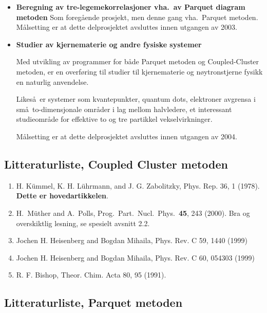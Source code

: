 \begin{itemize}
\item {\bf Beregning av tre-legemekorrelasjoner vha.\ av 
            Parquet diagram  metoden}
Som foreg\aa ende prosjekt, men denne gang vha.~Parquet metoden.
M\aa lsetting er at dette delprosjektet avsluttes innen utgangen av 2003.


\item {\bf Studier av kjernematerie og andre fysiske systemer}

Med utvikling av programmer for b\aa de Parquet metoden og Coupled-Cluster
metoden, er en overf\o ring til studier til kjernematerie og n\o ytronstjerne
fysikk en naturlig anvendelse. 

Likes\aa\ er systemer som kvantepunkter, quantum dots, elektroner avgrensa
i sm\aa\ to-dimensjonale omr\aa der i lag mellom halvledere,
et interessant studieomr\aa de for effektive to og tre partikkel 
vekselvirkninger.

M\aa lsetting er at dette delprosjektet avsluttes innen utgangen av 2004.

\end{itemize}



\subsection*{Litteraturliste, Coupled Cluster metoden}

\begin{enumerate}
\item H. K\"ummel, K. H. L\"uhrmann, and J. G. Zabolitzky, Phys. Rep.
36, 1 (1978). {\bf Dette er hovedartikkelen}.
\item H.~M\"uther and A.~Polls, Prog.~Part.~Nucl.~Phys.~{\bf 45}, 243 (2000).
Bra og overskiktlig lesning, se spesielt avsnitt 2.2.
\item Jochen H. Heisenberg and Bogdan Mihaila, 
Phys. Rev. C 59, 1440 (1999)
\item Jochen H. Heisenberg and Bogdan Mihaila, 
Phys. Rev. C 60, 054303 (1999) 
\item R. F. Bishop, Theor. Chim. Acta 80, 95 (1991).
\end{enumerate}

\subsection*{Litteraturliste, Parquet metoden}

